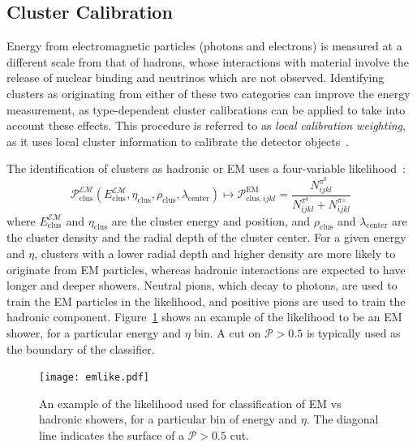 
\subsection{Cluster Calibration}

Energy from electromagnetic particles (photons and electrons) is measured at a different scale from that of hadrons, whose interactions with material involve the release of nuclear binding and neutrinos which are not observed. Identifying clusters as originating from either of these two categories can improve the energy measurement, as type-dependent cluster calibrations can be applied to take into account these effects. This procedure is referred to as \textit{local calibration weighting}, as it uses local cluster information to calibrate the detector objects~\cite{Loch:1967028}.

The identification of clusters as hadronic or EM uses a four-variable likelihood~\cite{Loch:1967028}:
%
\begin{equation}
\mathcal{P}_\mathrm{clus}^\mathcal{EM}(E_\mathrm{clus}^\mathcal{EM}, \eta_\mathrm{clus}, \rho_\mathrm{clus},\lambda_\mathrm{center} ) \mapsto \mathcal{P}^\mathrm{EM}_{\mathrm{clus},ijkl} = \frac{N_{ijkl}^{\pi^0}}{N_{ijkl}^{\pi^0} + N_{ijkl}^{\pi^\pm}}
\end{equation}
%
where $E_\mathrm{clus}^\mathcal{EM}$ and $\eta_\mathrm{clus}$ are the cluster energy and position, and $\rho_\mathrm{clus}$ and $\lambda_\mathrm{center}$ are the cluster density and the radial depth of the cluster center. For a given energy and $\eta$, clusters with a lower radial depth and higher density are more likely to originate from EM particles, whereas hadronic interactions are expected to have longer and deeper showers. Neutral pions, which decay to photons, are used to train the EM particles in the likelihood, and positive pions are used to train the hadronic component. Figure~\ref{fig:jet-reconstruction:cluster-calibration:em-like} shows an example of the likelihood to be an EM shower, for a particular energy and $\eta$ bin. A cut on $\mathcal{P} > 0.5$ is typically used as the boundary of the classifier.


\begin{figure}
\centering
\texttt{[image: emlike.pdf]}
\label{fig:jet-reconstruction:cluster-calibration:em-like}
\caption{An example of the likelihood used for classification of EM vs hadronic showers, for a particular bin of energy and $\eta$. The diagonal line indicates the surface of a $\mathcal{P} > 0.5$ cut.}
\end{figure}

